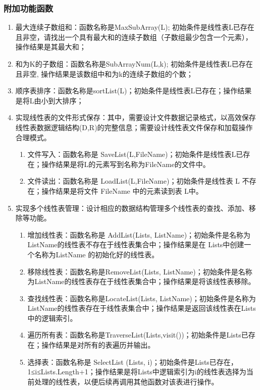 \documentclass[supercite]{Experimental_Report}
\newcommand{\whiteding}[1]{\ding{\numexpr171+#1\relax}}
\theoremstyle{definition}
\begin{document}
\subsubsection{附加功能函数}

\begin{enumerate}
    \item 最大连续子数组和：函数名称是MaxSubArray(L); 初始条件是线性表L已存在且非空，请找出一个具有最大和的连续子数组（子数组最少包含一个元素），操作结果是其最大和；
    \item 和为K的子数组：函数名称是SubArrayNum(L,k); 初始条件是线性表L已存在且非空, 操作结果是该数组中和为k的连续子数组的个数；
    \item 顺序表排序：函数名称是sortList(L)；初始条件是线性表L已存在；操作结果是将L由小到大排序；
    \item 实现线性表的文件形式保存：其中，\whiteding{1}需要设计文件数据记录格式，以高效保存线性表数据逻辑结构(D,{R})的完整信息；\whiteding{2}需要设计线性表文件保存和加载操作合理模式。
	\begin{enumerate}
	\item 文件写入：函数名称是 SaveList(L,FileName)；初始条件是线性表L已存在；操作结果是将L的元素写到名称为FileName的文件中。
	\item 文件读出：函数名称是 LoadList(L,FileName)；初始条件是线性表 L 不存在；操作结果是将文件 FileName 中的元素读到表 L中。
	\end{enumerate}
    \item 实现多个线性表管理：设计相应的数据结构管理多个线性表的查找、添加、移除等功能。
	\begin{enumerate}
	\item 增加线性表：函数名称是 AddList(Lists, ListName)；初始条件是名称为ListName的线性表不存在于线性表集合中；操作结果是在 Lists中创建一个名称为ListName 的初始化好的线性表。
	\item 移除线性表：函数名称是RemoveList(Lists, ListName)；初始条件是名称为ListName的线性表存在于线性表集合中；操作结果是将该线性表移除。
	\item 查找线性表：函数名称是LocateList(Lists, ListName)；初始条件是名称为ListName的线性表存在于线性表集合中；操作结果是返回该线性表在Lists中的逻辑索引。
	\item 遍历所有表：函数名称是TraverseList(Lists,visit())；初始条件是Lists已存在；操作结果是对所有的表遍历并输出。
	\item 选择表：函数名称是 SelectList (Lists, i)；初始条件是Lists已存在，1≤i≤Lists.Length+1；操作结果是将Lists中逻辑索引为i的线性表选择为当前处理的线性表，以便后续再调用其他函数对该表进行操作。
	\end{enumerate}
\end{enumerate}
\end{document}
